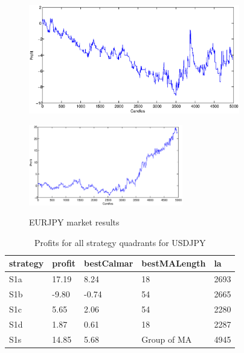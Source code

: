 \documentclass{tewiart}
\begin{document}
\begin{figure}[h]
\begin{minipage}{.49\linewidth}
\centering 
\includegraphics[width=0.82\textwidth]{images/S1d_eurjpy.eps}
\label{mansard}
\end{minipage}
\begin{minipage}{\linewidth}
\centering 
\includegraphics[width=0.6\textwidth]{images/S1s_eurjpy.eps}
\label{mansard}
\end{minipage}
\caption{EURJPY market results}
\end{figure}
\FloatBarrier
\newpage
\begin{table}[!t]
\caption{Profits for all strategy quadrants for USDJPY} 
 \begin{center} 
 \begin{tabular}{|l|l|l|l|l|} 
 \hline \textbf{strategy} & \textbf{profit} & \textbf{bestCalmar} & \textbf{bestMALength} & \textbf{la} \\ \hline  
S1a & 17.19 & 8.24 & 18 & 2693\\ \hline 
S1b & -9.80 & -0.74 & 54 & 2665\\ \hline 
S1c & 5.65 & 2.06 & 54 & 2280\\ \hline 
S1d & 1.87 & 0.61 & 18 & 2287\\ \hline 
S1s & 14.85 & 5.68 & Group of MA & 4945\\ 
\hline \end{tabular} 
 \end{center} 
 \end{table}
\FloatBarrier
\end{document}
